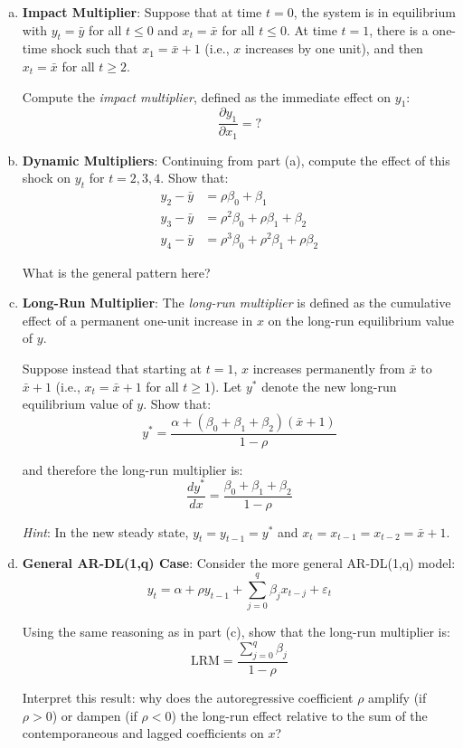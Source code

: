 \documentclass[11pt]{article}
\theoremstyle{definition}
\begin{document}
\begin{enumerate}[a)]
	\item \textbf{Impact Multiplier}: Suppose that at time $t=0$, the system is in equilibrium with $y_t = \bar{y}$ for all $t \leq 0$ and $x_t = \bar{x}$ for all $t \leq 0$. At time $t=1$, there is a one-time shock such that $x_1 = \bar{x} + 1$ (i.e., $x$ increases by one unit), and then $x_t = \bar{x}$ for all $t \geq 2$.
	
	Compute the \textit{impact multiplier}, defined as the immediate effect on $y_1$:
	$$
	\frac{\partial y_1}{\partial x_1} = ?
	$$
	
	\item \textbf{Dynamic Multipliers}: Continuing from part (a), compute the effect of this shock on $y_t$ for $t = 2, 3, 4$. Show that:
	\begin{align*}
	y_2 - \bar{y} &= \rho \beta_0 + \beta_1 \\
	y_3 - \bar{y} &= \rho^2 \beta_0 + \rho \beta_1 + \beta_2 \\
	y_4 - \bar{y} &= \rho^3 \beta_0 + \rho^2 \beta_1 + \rho \beta_2
	\end{align*}
	
	What is the general pattern here?
	
	\item \textbf{Long-Run Multiplier}: The \textit{long-run multiplier} is defined as the cumulative effect of a permanent one-unit increase in $x$ on the long-run equilibrium value of $y$.
	
	Suppose instead that starting at $t=1$, $x$ increases permanently from $\bar{x}$ to $\bar{x} + 1$ (i.e., $x_t = \bar{x} + 1$ for all $t \geq 1$). Let $y^*$ denote the new long-run equilibrium value of $y$. Show that:
	$$
	y^* = \frac{\alpha + (\beta_0 + \beta_1 + \beta_2)(\bar{x} + 1)}{1 - \rho}
	$$
	
	and therefore the long-run multiplier is:
	$$
	\frac{dy^*}{dx} = \frac{\beta_0 + \beta_1 + \beta_2}{1 - \rho}
	$$
	
	\textit{Hint}: In the new steady state, $y_t = y_{t-1} = y^*$ and $x_t = x_{t-1} = x_{t-2} = \bar{x} + 1$.
	
	\item \textbf{General AR-DL(1,q) Case}: Consider the more general AR-DL(1,q) model:
	$$
	y_t = \alpha + \rho y_{t-1} + \sum_{j=0}^{q} \beta_j x_{t-j} + \varepsilon_t
	$$
	
	Using the same reasoning as in part (c), show that the long-run multiplier is:
	$$
	\text{LRM} = \frac{\sum_{j=0}^{q} \beta_j}{1 - \rho}
	$$
	
	Interpret this result: why does the autoregressive coefficient $\rho$ amplify (if $\rho > 0$) or dampen (if $\rho < 0$) the long-run effect relative to the sum of the contemporaneous and lagged coefficients on $x$?
\end{enumerate}
\end{document}
